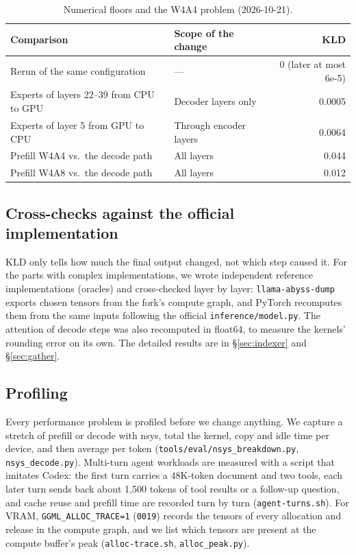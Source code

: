 \documentclass[11pt,a4paper]{article}
\newcommand{\code}[1]{\texttt{#1}}
\begin{document}
\begin{table}[h]
  \centering
  \small
  \caption{Numerical floors and the W4A4 problem (2026-10-21).}
  \label{tab:floors}
  \begin{tabular}{@{}l l r@{}}
    \toprule
    Comparison & Scope of the change & KLD \\
    \midrule
    Rerun of the same configuration & --- & 0 (later at most 6e-5) \\
    Experts of layers 22--39 from CPU to GPU & Decoder layers only & 0.0005 \\
    Experts of layer 5 from GPU to CPU & Through encoder layers & 0.0064 \\
    Prefill W4A4 vs.\ the decode path & All layers & 0.044 \\
    Prefill W4A8 vs.\ the decode path & All layers & 0.012 \\
    \bottomrule
  \end{tabular}
\end{table}

\subsection{Cross-checks against the official implementation}

KLD only tells how much the final output changed, not which step caused it. For the parts with complex implementations, we wrote independent reference implementations (oracles) and cross-checked layer by layer: \code{llama-abyss-dump} exports chosen tensors from the fork's compute graph, and PyTorch recomputes them from the same inputs following the official \code{inference/model.py}. The attention of decode steps was also recomputed in float64, to measure the kernels' rounding error on its own. The detailed results are in \S\ref{sec:indexer} and \S\ref{sec:gather}.

\subsection{Profiling}
\label{sec:profiling}

Every performance problem is profiled before we change anything. We capture a stretch of prefill or decode with nsys, total the kernel, copy and idle time per device, and then average per token (\code{tools/eval/nsys\_breakdown.py}, \code{nsys\_decode.py}). Multi-turn agent workloads are measured with a script that imitates Codex: the first turn carries a 48K-token document and two tools, each later turn sends back about 1,500 tokens of tool results or a follow-up question, and cache reuse and prefill time are recorded turn by turn (\code{agent-turns.sh}). For VRAM, \code{GGML\_ALLOC\_TRACE=1} (\code{0019}) records the tensors of every allocation and release in the compute graph, and we list which tensors are present at the compute buffer's peak (\code{alloc-trace.sh}, \code{alloc\_peak.py}).
\end{document}

